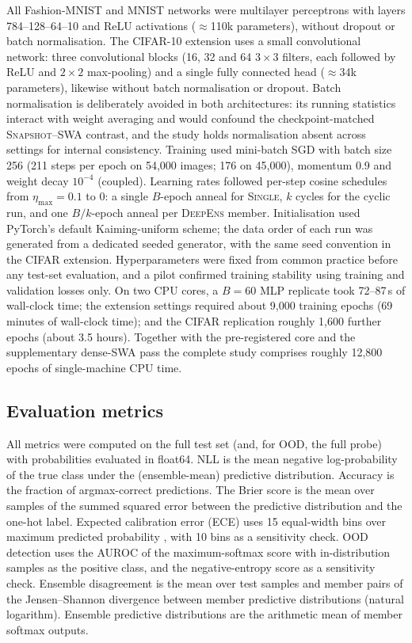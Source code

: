 \documentclass[11pt,a4paper]{article}
\newcommand{\deepens}{\textsc{DeepEns}}
\newcommand{\snapshot}{\textsc{Snapshot}}
\newcommand{\swa}{\textsc{SWA}}
\newcommand{\single}{\textsc{Single}}
\begin{document}
All Fashion-MNIST and MNIST networks were multilayer perceptrons with layers
784--128--64--10 and ReLU activations ($\approx$110k parameters), without
dropout or batch normalisation. The CIFAR-10 extension uses a small
convolutional network: three convolutional blocks (16, 32 and 64
$3\times3$ filters, each followed by ReLU and $2\times2$ max-pooling) and a
single fully connected head ($\approx$34k parameters), likewise without batch
normalisation or dropout. Batch normalisation is deliberately avoided in
both architectures: its running statistics interact with weight averaging
and would confound the checkpoint-matched \snapshot{}--\swa{} contrast, and
the study holds normalisation absent across settings for internal
consistency. Training used mini-batch SGD with batch size 256 (211 steps
per epoch on 54{,}000 images; 176 on 45{,}000), momentum 0.9 and weight
decay $10^{-4}$ (coupled). Learning rates followed per-step cosine schedules
from $\eta_{\max}=0.1$ to $0$: a single $B$-epoch anneal for \single{}, $k$
cycles for the cyclic run, and one $B/k$-epoch anneal per \deepens{}
member. Initialisation used PyTorch's default Kaiming-uniform scheme; the
data order of each run was generated from a dedicated seeded generator, with
the same seed convention in the CIFAR extension. Hyperparameters were
fixed from common practice before any test-set evaluation, and a pilot
confirmed training stability using training and validation losses only. On
two CPU cores, a $B=60$ MLP replicate took 72--87\,s of wall-clock time; the
extension settings required about 9{,}000 training epochs (69 minutes of
wall-clock time); and the CIFAR replication roughly 1{,}600 further epochs
(about 3.5 hours). Together with the pre-registered core and the
supplementary dense-\swa{} pass the complete study comprises roughly 12{,}800
epochs of single-machine CPU time.

\subsection{Evaluation metrics}\label{sec:metrics}

All metrics were computed on the full test set (and, for OOD, the full
probe) with probabilities evaluated in float64. NLL is the mean negative
log-probability of the true class under the (ensemble-mean) predictive
distribution. Accuracy is the fraction of argmax-correct predictions. The
Brier score is the mean over samples of the summed squared error between
the predictive distribution and the one-hot label. Expected calibration
error (ECE) uses 15 equal-width bins over maximum predicted probability
\citep{naeini2015,guo2017}, with 10 bins as a sensitivity check. OOD
detection uses the AUROC of the maximum-softmax score
\citep{hendrycks2017} with in-distribution samples as the positive class,
and the negative-entropy score as a sensitivity check. Ensemble disagreement
is the mean over test samples and member pairs of the Jensen--Shannon
divergence between member predictive distributions (natural logarithm).
Ensemble predictive distributions are the arithmetic mean of member softmax
outputs.
\end{document}

